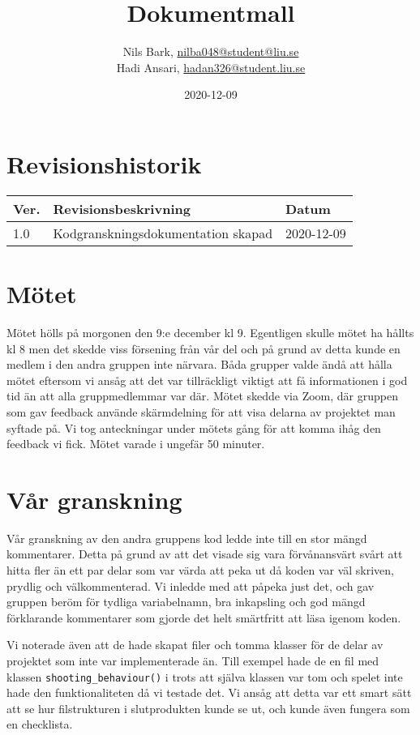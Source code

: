 \documentclass{TDP003mall}
\author{Nils Bark, \url{nilba048@student@liu.se}\\
  Hadi Ansari, \url{hadan326@student.liu.se}}
\title{Dokumentmall}
\date{2020-12-09}
\begin{document}
\projectpage
\section{Revisionshistorik}
\begin{table}[!h]
\begin{tabularx}{\linewidth}{|l|X|l|}
\hline
Ver. & Revisionsbeskrivning & Datum \\\hline
1.0 & Kodgranskningsdokumentation skapad & 2020-12-09\\\hline
\end{tabularx}
\end{table}


\section{Mötet}
Mötet hölls på morgonen den 9:e december kl 9. Egentligen skulle mötet ha hållts kl 8 men det skedde viss försening från vår del och på grund av detta kunde en medlem i den andra gruppen inte närvara.
Båda grupper valde ändå att hålla mötet eftersom vi ansåg att det var tillräckligt viktigt att få informationen i god tid än att alla gruppmedlemmar var där.
Mötet skedde via Zoom, där gruppen som gav feedback använde skärmdelning för att visa delarna av projektet man syftade på. Vi tog anteckningar under mötets gång för att komma ihåg den feedback vi fick. 
Mötet varade i ungefär 50 minuter.

\section{Vår granskning}
Vår granskning av den andra gruppens kod ledde inte till en stor mängd kommentarer. 
Detta på grund av att det visade sig vara förvånansvärt svårt att hitta fler än ett par delar som var värda att peka ut då koden var väl skriven, prydlig och välkommenterad. 
Vi inledde med att påpeka just det, och gav gruppen beröm för tydliga variabelnamn, 
bra inkapsling och god mängd förklarande kommentarer som gjorde det helt smärtfritt att läsa igenom koden.

Vi noterade även att de hade skapat filer och tomma klasser för de delar av projektet som inte var implementerade än. 
Till exempel hade de en fil med klassen \texttt{shooting\_behaviour()} i trots att själva klassen var tom och spelet inte hade den funktionaliteten då vi testade det. 
Vi ansåg att detta var ett smart sätt att se hur filstrukturen i slutprodukten kunde se ut, och kunde även fungera som en checklista.
\end{document}
